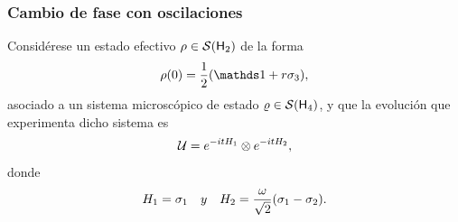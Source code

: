 \subsubsection{Cambio de fase con oscilaciones}

Considérese un estado efectivo $\rho\in\mathcal{S}({\sf H}_{2})$ de la forma
\begin{equation*}
    \rho(0)=\frac{1}{2}(\Id+r\pauli{3}),
\end{equation*}
asociado a un sistema microscópico de estado $\varrho\in\mathcal{S}({\sf H}_{4})$, y que la evolución que experimenta dicho sistema es
\begin{equation*}
    \mathcal{U}=e^{-itH_{1}}\otimes e^{-itH_{2}},
\end{equation*}
donde
\begin{align*}
    H_{1}=\sigma_{1} & & y & &H_{2}=\frac{\omega}{\sqrt{2}}(\sigma_{1}-\sigma_{2}).
\end{align*}

